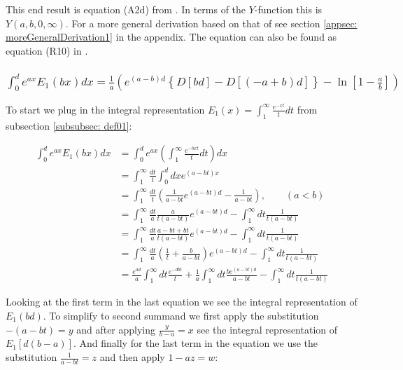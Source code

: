 \documentclass[bibliography=totocnumbered]{scrartcl}
\newcommand{\assume}[1][\text{MISSING PARAMETER}]{,\qquad\left(#1\right)}
\begin{document}
	This end result is equation (A2d) from \cite{boer1990calc}. In terms of the $Y$-function this is $Y\left(a,b,0,\infty\right)$. For a more general derivation based on that of \autocite[73\psq]{schloemilch} see section \ref{appsec: moreGeneralDerivation1} in the appendix. The equation can also be found as equation (R10) in \cite{sherman}.

	\subsubsection[A integral of $E_1\left(x\right)$, involving the exponential function]{$\int_{0}^{d}e^{ax}E_1\left(bx\right)dx=\frac{1}{a}\left(e^{\left(a-b\right)d}\left\{D\left[bd\right]-D\left[\left(-a+b\right)d\right]\right\}-\ln{\left[1-\frac{a}{b}\right]}\right)$}

	To start we plug in the integral representation $E_1\left(x\right)=\int_{1}^{\infty}\frac{e^{-xt}}{t}dt$ from subsection \ref{subsubsec: def01}:

	\begin{align}
		\int_{0}^{d}e^{ax}E_1\left(bx\right)dx&=\int_{0}^{d}e^{ax}\left(\int_{1}^{\infty}\frac{e^{-bxt}}{t}dt\right)dx\\
		&=\int_{1}^{\infty}\frac{dt}{t}\int_{0}^{d}dxe^{\left(a-bt\right)x}\\
		&=\int_{1}^{\infty}\frac{dt}{t}\left(\frac{1}{a-bt}e^{\left(a-bt\right)d}-\frac{1}{a-bt}\right)\assume[a<b]\\
		&=\int_{1}^{\infty}\frac{dt}{a}\frac{a}{t\left(a-bt\right)}e^{\left(a-bt\right)d}-\int_{1}^{\infty}dt\frac{1}{t\left(a-bt\right)}\\
		&=\int_{1}^{\infty}\frac{dt}{a}\frac{a-bt+bt}{t\left(a-bt\right)}e^{\left(a-bt\right)d}-\int_{1}^{\infty}dt\frac{1}{t\left(a-bt\right)}\\
		&=\int_{1}^{\infty}\frac{dt}{a}\left(\frac{1}{t}+\frac{b}{a-bt}\right)e^{\left(a-bt\right)d}-\int_{1}^{\infty}dt\frac{1}{t\left(a-bt\right)}\\
		&=\frac{e^{ad}}{a}\int_{1}^{\infty}dt\frac{e^{-dbt}}{t}+\frac{1}{a}\int_{1}^{\infty}dt\frac{be^{\left(a-bt\right)d}}{a-bt}-\int_{1}^{\infty}dt\frac{1}{t\left(a-bt\right)}
	\end{align}

	Looking at the first term in the last equation we see the integral representation of $E_1\left(bd\right)$. To simplify to second summand we first apply the substitution $-\left(a-bt\right)=y$ and after applying $\frac{y}{b-a}=x$ see the integral representation of $E_1\left[d\left(b-a\right)\right]$. And finally for the last term in the equation we use the substitution $\frac{1}{a-bt}=z$ and then apply $1-az=w$:
\end{document}
